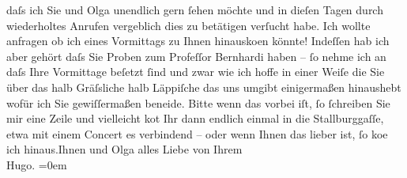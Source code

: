 \begin{ledgroupsized}[t]{13cm}
               daſs ich Sie und Olga unendlich gern ſehen möchte
               und in dieſen Tagen durch wiederholtes Anrufen vergeblich dies zu betätigen verſucht
               habe. Ich wollte anfragen ob ich eines Vormittags zu Ihnen hinausko{\geminationm}en könnte! Indeſſen hab ich aber gehört daſs Sie {\pb}Proben zum Profeſſor Bernhardi haben – ſo nehme ich an daſs Ihre Vormittage
               beſetzt ſind und zwar wie ich hoffe in einer Weiſe die Sie über das halb Gräſsliche
               halb Läppiſche das uns umgibt einigermaßen hinaushebt wofür ich Sie gewiſſermaßen
               beneide.\pend
           \pstart
           Bitte wenn das vorbei iſt, {\pb}ſo
               ſchreiben Sie mir eine Zeile und vielleicht ko{\geminationm}t Ihr
               dann endlich einmal in die Stallburggaſſe, etwa
               mit einem Concert es verbindend – oder wenn Ihnen das lieber ist, ſo ko{\geminationm}e ich hinaus.\hspace*{1.5em}Ihnen
               und Olga alles Liebe \pend
           \pstart
           von Ihrem{\\[\baselineskip]}\spacefill\mbox{Hugo.}\pend
           \leftskip=0em{}
         
         \endnumbering{}\end{ledgroupsized}  \newcommand{\dateiname}{L02313}\newcommand{\titel}{Hugo von Hofmannsthal an Arthur Schnitzler, [Anfang Dezember 1918]}\newcommand{\editorInnen}{Martin Anton Müller und Gerd-Hermann Susen}
      